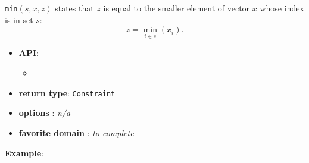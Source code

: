 \begin{notedef}
  \texttt{min}$(s,x,z)$ states that $z$ is equal to the smaller
  element of vector $x$ whose index is in set $s$:
$$z = \min_{i\in s}( x_i ).$$
\end{notedef}
\begin{itemize}
	\item \textbf{API}:
	\begin{itemize}
		\item {}
	\end{itemize}
	\item \textbf{return type}: \texttt{Constraint}
	\item \textbf{options} : \emph{n/a}
	\item \textbf{favorite domain} : \emph{to complete}
\end{itemize}

\textbf{Example}:
